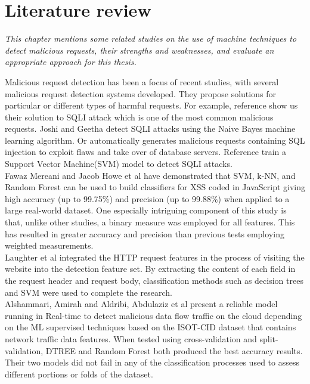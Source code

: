 \chapter{Literature review}
\label{chap:literaturereview}
	\textit{This chapter mentions some related studies on the use of machine techniques to detect malicious requests, their strengths and weaknesses, and evaluate an appropriate approach for this thesis.}
	\minitoc

Malicious request detection has been a focus of recent studies, with several malicious request detection systems developed. They propose solutions for particular or different types of harmful requests. For example, reference \cite{Joshi_sqli} show us their solution to SQLI attack which is one of the most common malicious requests. Joshi and Geetha \cite{Joshi_sqli} detect SQLI attacks using the Naive Bayes machine learning algorithm. Or \cite{sqlmap} automatically generates malicious requests containing SQL injection to exploit flaws and take over of database servers. Reference \cite{sqli_ML} train a Support Vector Machine(SVM) model to detect SQLI attacks.\\ \newline
Fawaz Mereani and Jacob Howe et al\cite{Mereani2018} have demonstrated that SVM, k-NN, and Random Forest can be used to build classiﬁers for XSS coded in JavaScript giving high accuracy (up to 99.75\%) and precision (up to 99.88\%) when applied to a large real-world dataset. One especially intriguing component of this study is that, unlike other studies, a binary measure was employed for all features. This has resulted in greater accuracy and precision than previous tests employing weighted measurements.\\ \newline
Laughter et al \cite{laughter2021} integrated the HTTP request features in the process of visiting the website into the detection feature set. By extracting the content of each field in the request header and request body, classification methods such as decision trees and SVM were used to complete the research.\\
\newline
Alshammari, Amirah and Aldribi, Abdulaziz et al \cite{Alshammari2021} present a reliable model running in Real-time to detect malicious data flow traffic on the cloud depending on the ML supervised techniques based on the ISOT-CID dataset that contains network traffic data features. When tested using cross-validation and split-validation, DTREE and Random Forest both produced the best accuracy results. Their two models did not fail in any of the classification processes used to assess different portions or folds of the dataset.\\
